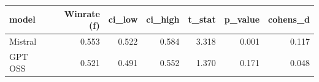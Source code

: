 \begin{tabular}{lrrrrrr}
\toprule
model & Winrate (f) & ci\_low & ci\_high & t\_stat & p\_value & cohens\_d \\
\midrule
Mistral & 0.553 & 0.522 & 0.584 & 3.318 & 0.001 & 0.117 \\
GPT OSS & 0.521 & 0.491 & 0.552 & 1.370 & 0.171 & 0.048 \\
\bottomrule
\end{tabular}
